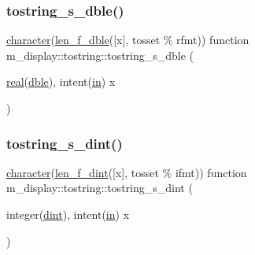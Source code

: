 \mbox{\label{interfacem__display_1_1tostring_a0525e98442a494642477bbe1cca0411a}} 
\subsubsection{\texorpdfstring{tostring\+\_\+s\+\_\+dble()}{tostring\_s\_dble()}}
{\footnotesize\ttfamily \hyperlink{option__stopwatch_83_8txt_abd4b21fbbd175834027b5224bfe97e66}{character}(\hyperlink{namespacem__display_aa013a639d5b0f7e40b627c9d712693f0}{len\+\_\+f\+\_\+dble}(\mbox{[}x\mbox{]}, tosset \% rfmt)) function m\+\_\+display\+::tostring\+::tostring\+\_\+s\+\_\+dble (\begin{DoxyParamCaption}\item[{\hyperlink{read__watch_83_8txt_abdb62bde002f38ef75f810d3a905a823}{real}(\hyperlink{namespacem__display_a46d90b75b6ccef7ccade133e5847e815}{dble}), intent(\hyperlink{M__journal_83_8txt_afce72651d1eed785a2132bee863b2f38}{in})}]{x }\end{DoxyParamCaption})\hspace{0.3cm}{\ttfamily [private]}}

\mbox{\label{interfacem__display_1_1tostring_afe88bd80ae8b45f99351f7feae986018}} 
\subsubsection{\texorpdfstring{tostring\+\_\+s\+\_\+dint()}{tostring\_s\_dint()}}
{\footnotesize\ttfamily \hyperlink{option__stopwatch_83_8txt_abd4b21fbbd175834027b5224bfe97e66}{character}(\hyperlink{namespacem__display_a6a2709cf5f243ee492f223b40c6b5143}{len\+\_\+f\+\_\+dint}(\mbox{[}x\mbox{]}, tosset \% ifmt)) function m\+\_\+display\+::tostring\+::tostring\+\_\+s\+\_\+dint (\begin{DoxyParamCaption}\item[{integer(\hyperlink{namespacem__display_a73f772e9702cad6f40b78364fde2c7cd}{dint}), intent(\hyperlink{M__journal_83_8txt_afce72651d1eed785a2132bee863b2f38}{in})}]{x }\end{DoxyParamCaption})\hspace{0.3cm}{\ttfamily [private]}}



